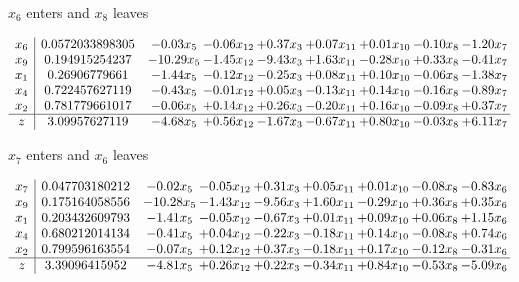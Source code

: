 \documentclass[8pt]{article}
\begin{document}
 $ x_{6} $ enters and $ x_{8} $ leaves 

 \[\begin{array}{c| c c@{\hskip 2pt} c@{\hskip 2pt} c@{\hskip 2pt} c@{\hskip 2pt} c@{\hskip 2pt} c@{\hskip 2pt} c@{\hskip 2pt} }
 x_{6}   &  0.0572033898305 & -0.03 x_{5} & -0.06 x_{12} & +  0.37 x_{3} & +  0.07 x_{11} & +  0.01 x_{10} & -0.10 x_{8} & -1.20 x_{7}\\
 x_{9}   &  0.194915254237 & -10.29 x_{5} & -1.45 x_{12} & -9.43 x_{3} & +  1.63 x_{11} & -0.28 x_{10} & +  0.33 x_{8} & -0.41 x_{7}\\
 x_{1}   &  0.26906779661 & -1.44 x_{5} & -0.12 x_{12} & -0.25 x_{3} & +  0.08 x_{11} & +  0.10 x_{10} & -0.06 x_{8} & -1.38 x_{7}\\
 x_{4}   &  0.722457627119 & -0.43 x_{5} & -0.01 x_{12} & +  0.05 x_{3} & -0.13 x_{11} & +  0.14 x_{10} & -0.16 x_{8} & -0.89 x_{7}\\
 x_{2}   &  0.781779661017 & -0.06 x_{5} & +  0.14 x_{12} & +  0.26 x_{3} & -0.20 x_{11} & +  0.16 x_{10} & -0.09 x_{8} & +  0.37 x_{7}\\
\hline
z    &  3.09957627119 & -4.68 x_{5} & +  0.56 x_{12} & -1.67 x_{3} & -0.67 x_{11} & +  0.80 x_{10} & -0.03 x_{8} & +  6.11 x_{7}\\
\end{array}\]


 $ x_{7} $ enters and $ x_{6} $ leaves 

 \[\begin{array}{c| c c@{\hskip 2pt} c@{\hskip 2pt} c@{\hskip 2pt} c@{\hskip 2pt} c@{\hskip 2pt} c@{\hskip 2pt} c@{\hskip 2pt} }
 x_{7}   &  0.047703180212 & -0.02 x_{5} & -0.05 x_{12} & +  0.31 x_{3} & +  0.05 x_{11} & +  0.01 x_{10} & -0.08 x_{8} & -0.83 x_{6}\\
 x_{9}   &  0.175164058556 & -10.28 x_{5} & -1.43 x_{12} & -9.56 x_{3} & +  1.60 x_{11} & -0.29 x_{10} & +  0.36 x_{8} & +  0.35 x_{6}\\
 x_{1}   &  0.203432609793 & -1.41 x_{5} & -0.05 x_{12} & -0.67 x_{3} & +  0.01 x_{11} & +  0.09 x_{10} & +  0.06 x_{8} & +  1.15 x_{6}\\
 x_{4}   &  0.680212014134 & -0.41 x_{5} & +  0.04 x_{12} & -0.22 x_{3} & -0.18 x_{11} & +  0.14 x_{10} & -0.08 x_{8} & +  0.74 x_{6}\\
 x_{2}   &  0.799596163554 & -0.07 x_{5} & +  0.12 x_{12} & +  0.37 x_{3} & -0.18 x_{11} & +  0.17 x_{10} & -0.12 x_{8} & -0.31 x_{6}\\
\hline
z    &  3.39096415952 & -4.81 x_{5} & +  0.26 x_{12} & +  0.22 x_{3} & -0.34 x_{11} & +  0.84 x_{10} & -0.53 x_{8} & -5.09 x_{6}\\
\end{array}\]
\end{document}
